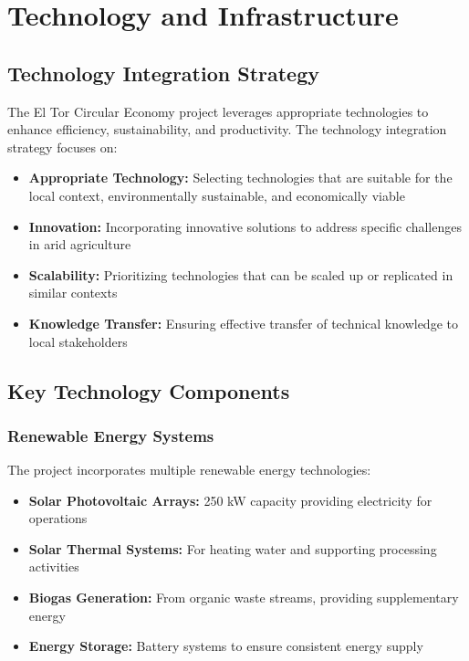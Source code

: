\section{Technology and Infrastructure}

\subsection{Technology Integration Strategy}

The El Tor Circular Economy project leverages appropriate technologies to enhance efficiency, sustainability, and productivity. The technology integration strategy focuses on:

\begin{itemize}
    \item \textbf{Appropriate Technology:} Selecting technologies that are suitable for the local context, environmentally sustainable, and economically viable
    \item \textbf{Innovation:} Incorporating innovative solutions to address specific challenges in arid agriculture
    \item \textbf{Scalability:} Prioritizing technologies that can be scaled up or replicated in similar contexts
    \item \textbf{Knowledge Transfer:} Ensuring effective transfer of technical knowledge to local stakeholders
\end{itemize}

\subsection{Key Technology Components}

\subsubsection{Renewable Energy Systems}

The project incorporates multiple renewable energy technologies:

\begin{itemize}
    \item \textbf{Solar Photovoltaic Arrays:} 250 kW capacity providing electricity for operations
    \item \textbf{Solar Thermal Systems:} For heating water and supporting processing activities
    \item \textbf{Biogas Generation:} From organic waste streams, providing supplementary energy
    \item \textbf{Energy Storage:} Battery systems to ensure consistent energy supply
\end{itemize}

